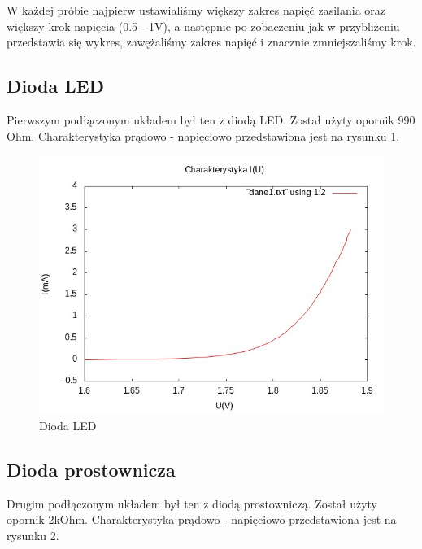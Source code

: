\documentclass[a4paper,11pt]{article}
\begin{document}
W każdej próbie najpierw ustawialiśmy większy zakres napięć zasilania oraz większy krok napięcia (0.5 - 1V), a następnie po zobaczeniu jak w przybliżeniu przedstawia się wykres, zawężaliśmy zakres napięć i znacznie zmniejszaliśmy krok.

\subsection{Dioda LED}

Pierwszym podłączonym układem był ten z diodą LED. Został użyty opornik 990 Ohm. Charakterystyka prądowo - napięciowo przedstawiona jest na rysunku 1.

\begin{figure}[ht]
 \begin{center}
  \includegraphics[width=12cm]{wykres1}
 \end{center}
 \caption{Dioda LED}
\end{figure}

\subsection{Dioda prostownicza}

Drugim podłączonym układem był ten z diodą prostowniczą. Został użyty opornik 2kOhm. Charakterystyka prądowo - napięciowo przedstawiona jest na rysunku 2.
\end{document}
